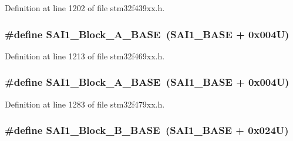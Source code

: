 Definition at line 1202 of file stm32f439xx.\+h.

\subsubsection[{\texorpdfstring{S\+A\+I1\+\_\+\+Block\+\_\+\+A\+\_\+\+B\+A\+SE}{SAI1_Block_A_BASE}}]{\setlength{\rightskip}{0pt plus 5cm}\#define S\+A\+I1\+\_\+\+Block\+\_\+\+A\+\_\+\+B\+A\+SE~({\bf S\+A\+I1\+\_\+\+B\+A\+SE} + 0x004\+U)}\hypertarget{group___peripheral__memory__map_ga31f72e5e5d7aea23bc8a5191bc32e900}{}\label{group___peripheral__memory__map_ga31f72e5e5d7aea23bc8a5191bc32e900}


Definition at line 1213 of file stm32f469xx.\+h.

\subsubsection[{\texorpdfstring{S\+A\+I1\+\_\+\+Block\+\_\+\+A\+\_\+\+B\+A\+SE}{SAI1_Block_A_BASE}}]{\setlength{\rightskip}{0pt plus 5cm}\#define S\+A\+I1\+\_\+\+Block\+\_\+\+A\+\_\+\+B\+A\+SE~({\bf S\+A\+I1\+\_\+\+B\+A\+SE} + 0x004\+U)}\hypertarget{group___peripheral__memory__map_ga31f72e5e5d7aea23bc8a5191bc32e900}{}\label{group___peripheral__memory__map_ga31f72e5e5d7aea23bc8a5191bc32e900}


Definition at line 1283 of file stm32f479xx.\+h.

\subsubsection[{\texorpdfstring{S\+A\+I1\+\_\+\+Block\+\_\+\+B\+\_\+\+B\+A\+SE}{SAI1_Block_B_BASE}}]{\setlength{\rightskip}{0pt plus 5cm}\#define S\+A\+I1\+\_\+\+Block\+\_\+\+B\+\_\+\+B\+A\+SE~({\bf S\+A\+I1\+\_\+\+B\+A\+SE} + 0x024\+U)}\hypertarget{group___peripheral__memory__map_gacdb59b321830def8c7a57c154178bc48}{}\label{group___peripheral__memory__map_gacdb59b321830def8c7a57c154178bc48}


